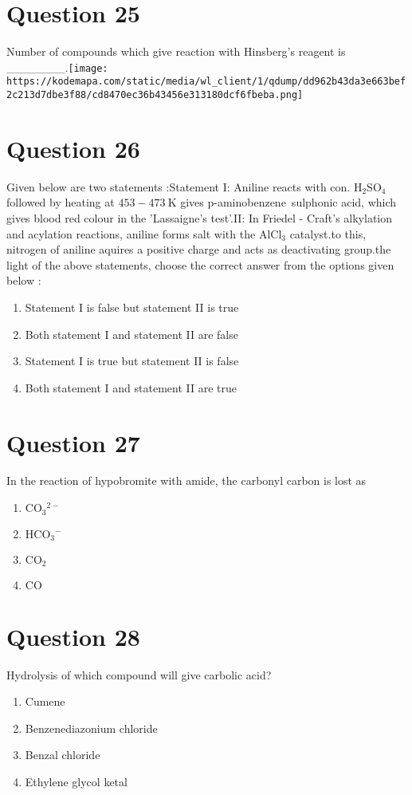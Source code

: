 \documentclass{article}
\begin{document}
\section*{Question 25}
Number of compounds which give reaction with Hinsberg's reagent is _______.\texttt{[image: https://kodemapa.com/static/media/wl\_client/1/qdump/dd962b43da3e663bef2c213d7dbe3f88/cd8470ec36b43456e313180dcf6fbeba.png]}\newline\newline
\begin{enumerate}[label=(\alph*)]
\end{enumerate}
\newpage
\section*{Question 26}
Given below are two statements :Statement I: Aniline reacts with con. \(\mathrm{H}_2 \mathrm{SO}_4\) followed by heating at \(453-473 \mathrm{~K}\) gives p-aminobenzene sulphonic acid, which gives blood red colour in the 'Lassaigne's test'.\newlineStatement II: In Friedel - Craft's alkylation and acylation reactions, aniline forms salt with the \(\mathrm{AlCl}_3\) catalyst.\newlineDue to this, nitrogen of aniline aquires a positive charge and acts as deactivating group.\newlineIn the light of the above statements, choose the correct answer from the options given below :
\begin{enumerate}[label=(\alph*)]
\item Statement I is false but statement II is true
\item Both statement I and statement II are false
\item Statement I is true but statement II is false
\item Both statement I and statement II are true
\end{enumerate}
\newpage
\section*{Question 27}
In the reaction of hypobromite with amide, the carbonyl carbon is lost as 
\begin{enumerate}[label=(\alph*)]
\item \(\mathrm{CO}_3{ }^{2-}\)
\item \(\mathrm{HCO}_3{ }^{-}\)
\item \(\mathrm{CO}_2\)
\item \(\mathrm{CO}\)
\end{enumerate}
\newpage
\section*{Question 28}
Hydrolysis of which compound will give carbolic acid? 
\begin{enumerate}[label=(\alph*)]
\item Cumene
\item Benzenediazonium chloride
\item Benzal chloride
\item Ethylene glycol ketal
\end{enumerate}
\newpage
\end{document}
